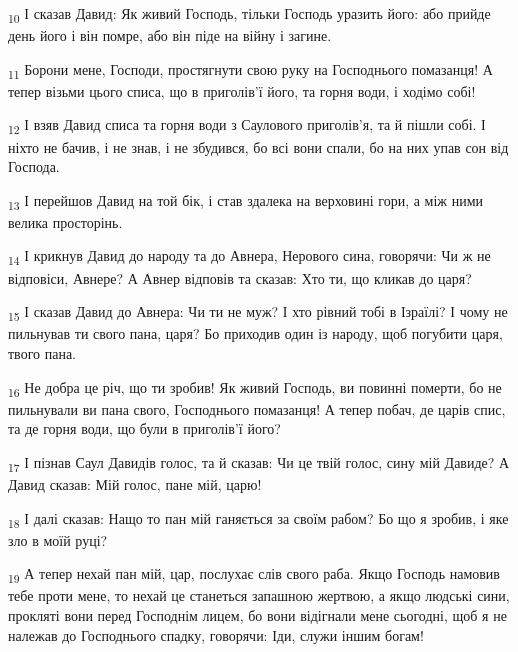 \begin{tcolorbox}
\textsubscript{10} І сказав Давид: Як живий Господь, тільки Господь уразить його: або прийде день його і він помре, або він піде на війну і загине.
\end{tcolorbox}
\begin{tcolorbox}
\textsubscript{11} Борони мене, Господи, простягнути свою руку на Господнього помазанця! А тепер візьми цього списа, що в приголів'ї його, та горня води, і ходімо собі!
\end{tcolorbox}
\begin{tcolorbox}
\textsubscript{12} І взяв Давид списа та горня води з Саулового приголів'я, та й пішли собі. І ніхто не бачив, і не знав, і не збудився, бо всі вони спали, бо на них упав сон від Господа.
\end{tcolorbox}
\begin{tcolorbox}
\textsubscript{13} І перейшов Давид на той бік, і став здалека на верховині гори, а між ними велика просторінь.
\end{tcolorbox}
\begin{tcolorbox}
\textsubscript{14} І крикнув Давид до народу та до Авнера, Нерового сина, говорячи: Чи ж не відповіси, Авнере? А Авнер відповів та сказав: Хто ти, що кликав до царя?
\end{tcolorbox}
\begin{tcolorbox}
\textsubscript{15} І сказав Давид до Авнера: Чи ти не муж? І хто рівний тобі в Ізраїлі? І чому не пильнував ти свого пана, царя? Бо приходив один із народу, щоб погубити царя, твого пана.
\end{tcolorbox}
\begin{tcolorbox}
\textsubscript{16} Не добра це річ, що ти зробив! Як живий Господь, ви повинні померти, бо не пильнували ви пана свого, Господнього помазанця! А тепер побач, де царів спис, та де горня води, що були в приголів'ї його?
\end{tcolorbox}
\begin{tcolorbox}
\textsubscript{17} І пізнав Саул Давидів голос, та й сказав: Чи це твій голос, сину мій Давиде? А Давид сказав: Мій голос, пане мій, царю!
\end{tcolorbox}
\begin{tcolorbox}
\textsubscript{18} І далі сказав: Нащо то пан мій ганяється за своїм рабом? Бо що я зробив, і яке зло в моїй руці?
\end{tcolorbox}
\begin{tcolorbox}
\textsubscript{19} А тепер нехай пан мій, цар, послухає слів свого раба. Якщо Господь намовив тебе проти мене, то нехай це станеться запашною жертвою, а якщо людські сини, прокляті вони перед Господнім лицем, бо вони відігнали мене сьогодні, щоб я не належав до Господнього спадку, говорячи: Іди, служи іншим богам!
\end{tcolorbox}
